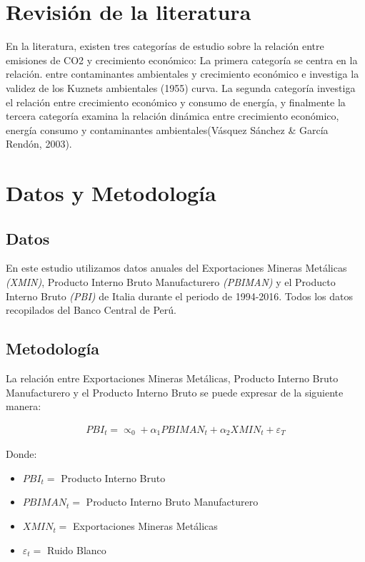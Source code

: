 \documentclass[11pt,]{article}
\providecommand{\tightlist}{%
\setlength{\itemsep}{0pt}\setlength{\parskip}{0pt}}
\begin{document}
\hypertarget{revision-de-la-literatura}{%
\section{Revisión de la literatura}\label{revision-de-la-literatura}}

En la literatura, existen tres categorías de estudio sobre la relación
entre emisiones de CO2 y crecimiento económico: La primera categoría se
centra en la relación. entre contaminantes ambientales y crecimiento
económico e investiga la validez de los Kuznets ambientales (1955)
curva. La segunda categoría investiga el relación entre crecimiento
económico y consumo de energía, y finalmente la tercera categoría
examina la relación dinámica entre crecimiento económico, energía
consumo y contaminantes ambientales(Vásquez Sánchez \& García Rendón,
2003).

\hypertarget{datos-y-metodologia}{%
\section{Datos y Metodología}\label{datos-y-metodologia}}

\hypertarget{datos}{%
\subsection{Datos}\label{datos}}

En este estudio utilizamos datos anuales del Exportaciones Mineras
Metálicas \emph{(XMIN)}, Producto Interno Bruto Manufacturero
\emph{(PBIMAN)} y el Producto Interno Bruto \emph{(PBI)} de Italia
durante el periodo de 1994-2016. Todos los datos recopilados del Banco
Central de Perú.

\hypertarget{metodologia}{%
\subsection{Metodología}\label{metodologia}}

La relación entre Exportaciones Mineras Metálicas, Producto Interno
Bruto Manufacturero y el Producto Interno Bruto se puede expresar de la
siguiente manera:

\begin{eqnarray}\label{eq1}
PBI_t=\propto_0+\alpha_1PBIMAN_t+\alpha_2XMIN_t+\varepsilon_T     
\end{eqnarray}

Donde:

\begin{itemize}
\tightlist
\item
  \({PBI}_t =\) Producto Interno Bruto
\item
  \({PBIMAN}_t =\) Producto Interno Bruto Manufacturero
\item
  \({XMIN}_t =\) Exportaciones Mineras Metálicas
\item
  \(\varepsilon_t =\) Ruido Blanco
\end{itemize}
\end{document}
